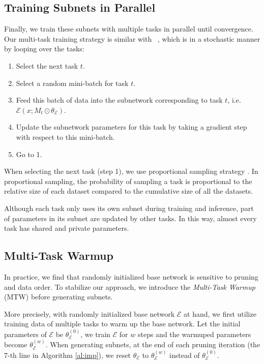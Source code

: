 \documentclass[letterpaper]{article} %
\newcommand{\citet}[1]{\citeauthor{#1}~\shortcite{#1}}
\begin{document}
\subsection{Training Subnets in Parallel}
Finally, we train these subnets with multiple tasks in parallel until convergence. Our multi-task training strategy is similar with \citet{DBLP:conf/icml/CollobertW08}, which is in a stochastic manner by looping over the tasks:
\begin{enumerate}
\item Select the next task $t$.
\item Select a random mini-batch for task $t$.
\item Feed this batch of data into the subnetwork corresponding to task $t$, i.e. $\mathcal{E}(x;M_t\odot\theta_\mathcal{E})$.
\item Update the subnetwork parameters for this task by taking a gradient step with respect to this mini-batch.
\item Go to 1.
\end{enumerate}

When selecting the next task (step 1), we use proportional sampling strategy \cite{DBLP:conf/aaai/SanhWR19}. In proportional sampling, the probability of sampling a task is proportional to the relative size of each dataset compared to the cumulative size of all the datasets.

Although each task only uses its own subnet during training and inference, part of parameters in its subnet are updated by other tasks. In this way, almost every task has shared and private parameters.

\subsection{Multi-Task Warmup}
In practice, we find that randomly initialized base network is sensitive to pruning and data order. To stabilize our approach, we introduce the \emph{Multi-Task Warmup} (MTW) before generating subnets.

More precisely, with randomly initialized base network $\mathcal{E}$ at hand, we first utilize training data of multiple tasks to warm up the base network. Let the initial parameters of $\mathcal{E}$ be $\theta_\mathcal{E}^{(0)}$, we train $\mathcal{E}$ for $w$ steps and the warmuped parameters become $\theta_\mathcal{E}^{(w)}$. When generating subnets, at the end of each pruning iteration (the 7-th line in Algorithm \ref{al:imp}), we reset $\theta_\mathcal{E}$ to $\theta_\mathcal{E}^{(w)}$ instead of $\theta_\mathcal{E}^{(0)}$.
\end{document}
